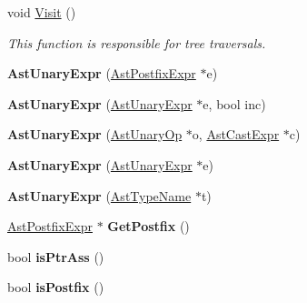 \begin{DoxyCompactItemize}
\item 
void \hyperlink{classAstUnaryExpr_ae35427088d6f5c889e8e80573a3750fc}{Visit} ()
\begin{DoxyCompactList}\small\item\em This function is responsible for tree traversals. \end{DoxyCompactList}\item 
\hypertarget{classAstUnaryExpr_a7afc6e7c4cf309676aa701656c70453a}{{\bfseries Ast\-Unary\-Expr} (\hyperlink{classAstPostfixExpr}{Ast\-Postfix\-Expr} $\ast$e)}\label{classAstUnaryExpr_a7afc6e7c4cf309676aa701656c70453a}

\item 
\hypertarget{classAstUnaryExpr_a82859566c71d787e29263ff3ba013261}{{\bfseries Ast\-Unary\-Expr} (\hyperlink{classAstUnaryExpr}{Ast\-Unary\-Expr} $\ast$e, bool inc)}\label{classAstUnaryExpr_a82859566c71d787e29263ff3ba013261}

\item 
\hypertarget{classAstUnaryExpr_ad71de2cd2c65b31e5f5f5fde4e75fc14}{{\bfseries Ast\-Unary\-Expr} (\hyperlink{classAstUnaryOp}{Ast\-Unary\-Op} $\ast$o, \hyperlink{classAstCastExpr}{Ast\-Cast\-Expr} $\ast$c)}\label{classAstUnaryExpr_ad71de2cd2c65b31e5f5f5fde4e75fc14}

\item 
\hypertarget{classAstUnaryExpr_a22b7c004d42c54c96b40de10cc90a07e}{{\bfseries Ast\-Unary\-Expr} (\hyperlink{classAstUnaryExpr}{Ast\-Unary\-Expr} $\ast$e)}\label{classAstUnaryExpr_a22b7c004d42c54c96b40de10cc90a07e}

\item 
\hypertarget{classAstUnaryExpr_a305b745cf1449c3d3dc4e74dcd768ef1}{{\bfseries Ast\-Unary\-Expr} (\hyperlink{classAstTypeName}{Ast\-Type\-Name} $\ast$t)}\label{classAstUnaryExpr_a305b745cf1449c3d3dc4e74dcd768ef1}

\item 
\hypertarget{classAstUnaryExpr_a0892bfd110770a877a6c654875beae05}{\hyperlink{classAstPostfixExpr}{Ast\-Postfix\-Expr} $\ast$ {\bfseries Get\-Postfix} ()}\label{classAstUnaryExpr_a0892bfd110770a877a6c654875beae05}

\item 
\hypertarget{classAstUnaryExpr_a0f960c91e1328b3ca78cf0bd98790900}{bool {\bfseries is\-Ptr\-Ass} ()}\label{classAstUnaryExpr_a0f960c91e1328b3ca78cf0bd98790900}

\item 
\hypertarget{classAstUnaryExpr_a8adfdc9b288dcb86e7ed6854601eef28}{bool {\bfseries is\-Postfix} ()}\label{classAstUnaryExpr_a8adfdc9b288dcb86e7ed6854601eef28}


\end{DoxyCompactItemize}
